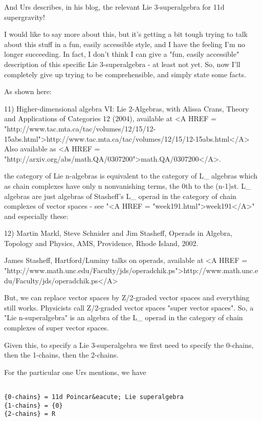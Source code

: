 And Urs describes, in his blog, the relevant Lie 3-superalgebra
for 11d supergravity!

I would like to say more about this, but it's getting a bit 
tough trying to talk about this stuff in a fun, easily accessible 
style, and I have the feeling I'm no longer succeeding.  In fact,
I don't think I can give a "fun, easily accessible" description 
of this specific Lie 3-superalgebra - at least not yet.  So, 
now I'll completely give up trying to be comprehensible, and simply 
state some facts.

As shown here:

11) Higher-dimensional algebra VI: Lie 2-Algebras, with Alissa
Crans, Theory and Applications of Categories 12 (2004),
available at <A HREF = "http://www.tac.mta.ca/tac/volumes/12/15/12-15abs.html">http://www.tac.mta.ca/tac/volumes/12/15/12-15abs.html</A>  
Also available as <A HREF = "http://arxiv.org/abs/math.QA/0307200">math.QA/0307200</A>.

the category of Lie n-algebras is equivalent to the category
of L_{\infty } algebras which as chain complexes have only n
nonvanishing terms, the 0th to the (n-1)st.  L_{\infty } algebras
are just algebras of Stasheff's L_{\infty } operad in the category
of chain complexes of vector spaces - see "<A HREF = "week191.html">week191</A>"
and especially these:

12) Martin Markl, Steve Schnider and Jim Stasheff, Operads in Algebra,
Topology and Physics, AMS, Providence, Rhode Island, 2002.

James Stasheff, Hartford/Luminy talks on operads, available at 
<A HREF = "http://www.math.unc.edu/Faculty/jds/operadchik.ps">http://www.math.unc.edu/Faculty/jds/operadchik.ps</A>

But, we can replace vector spaces by Z/2-graded vector spaces and
everything still works.  Physicists call Z/2-graded vector spaces
"super vector spaces".  So, a "Lie n-superalgebra"
is an algebra of the L_{\infty } operad in the category of
chain complexes of super vector spaces.

Given this, to specify a Lie 3-superalgebra we first need to
specify the 0-chains, then the 1-chains, then the 2-chains.  

For the particular one Urs mentions, we have


\begin{verbatim}

{0-chains} = 11d Poincar&eacute; Lie superalgebra
{1-chains} = {0}
{2-chains} = R
\end{verbatim}
    

